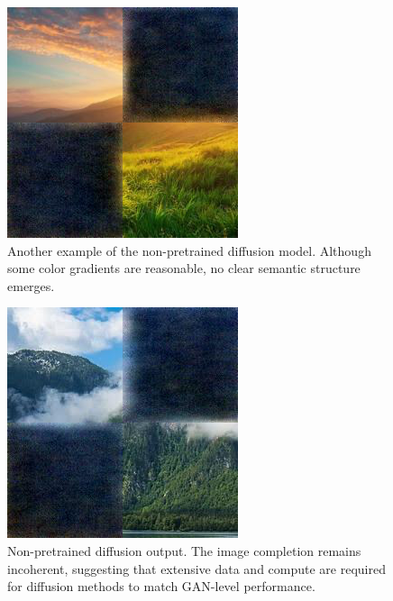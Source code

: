 \documentclass[sigconf]{acmart}
\begin{document}
\begin{figure}[h!]
    \centering
    \includegraphics[width=\linewidth]{diffusion_step_2_3}
    \caption{Another example of the non-pretrained diffusion model. Although some color gradients are reasonable, no clear semantic structure emerges.}
    \label{fig:diffusion_step_2_3}
\end{figure}

\begin{figure}[h!]
    \centering
    \includegraphics[width=\linewidth]{diffusion_step_2_4}
    \caption{Non-pretrained diffusion output. The image completion remains incoherent, suggesting that extensive data and compute are required for diffusion methods to match GAN-level performance.}
    \label{fig:diffusion_step_2_4}
\end{figure}
\end{document}
